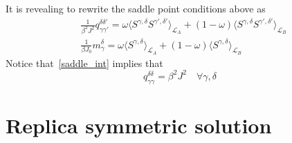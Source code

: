 \documentclass[onecolumn,superscriptaddress,pr]{revtex4}
\begin{document}
%
It is revealing to rewrite the saddle point conditions above as 
%
\begin{align}
\label{saddle_int}
& \frac{1}{\beta^2J^2}q_{\gamma\gamma'}^{\delta\delta'}=
\omega\langle S^{\gamma,\delta} S^{\gamma',\delta'}\rangle_{{\mathcal L}_A}+
(1-\omega)\langle S^{\gamma,\delta}S^{\gamma',\delta'}
\rangle_{{\mathcal L}_B}\\
\label{saddle_int1}
& \frac{1}{\beta J_0}m_\gamma^\delta=\omega\langle S^{\gamma,\delta}
\rangle_{{\mathcal L}_A}+(1-\omega)\langle S^{\gamma,\delta}
\rangle_{{\mathcal L}_B}
\end{align}
%
Notice that~\eqref{saddle_int} implies that 
%
\begin{equation}
q^{\delta\delta}_{\gamma\gamma}=\beta^2J^2\quad\forall \gamma,\delta
\end{equation}
%

\section{Replica symmetric solution}
\end{document}
